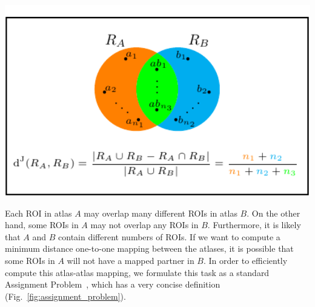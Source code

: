\documentclass[10pt,letterpaper]{article}\usepackage[]{graphicx}\usepackage[]{color}
\begin{document}
	{\centering
	\begin{minipage}[c]{0.55\textwidth}
	\includegraphics[width=1\textwidth,clip,trim=0cm 0cm 0cm 0.26cm]{venn_diagram.pdf}
	\end{minipage}\hfill
	\begin{minipage}[c]{0.43\textwidth}
	\captionsetup{type=figure}\label{fig:jaccard}
	\end{minipage}}

\vspace{0.25cm}

Each ROI in atlas $A$ may overlap many different ROIs in atlas $B$. On the other hand, some ROIs in $A$ may not overlap any ROIs in $B$. Furthermore, it is likely that $A$ and $B$ contain different numbers of ROIs. If we want to compute a minimum distance one-to-one mapping between the atlases, it is possible that some ROIs in $A$ will not have a mapped partner in $B$. In order to efficiently compute this atlas-atlas mapping, we formulate this task as a standard Assignment Problem~\cite{pentico2007}, which has a very concise definition (Fig.~\ref{fig:assignment_problem}).

\vspace{0.25cm}
\end{document}
